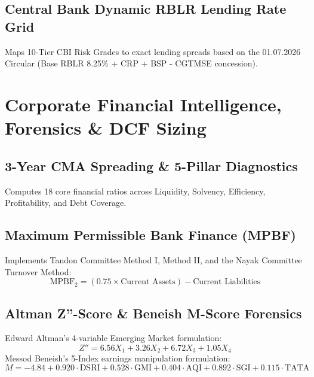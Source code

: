 \documentclass[11pt,a4paper,oneside]{report}
\begin{document}
\section{Central Bank Dynamic RBLR Lending Rate Grid}
Maps 10-Tier CBI Risk Grades to exact lending spreads based on the 01.07.2026 Circular (Base RBLR 8.25\% + CRP + BSP - CGTMSE concession).

\chapter{Corporate Financial Intelligence, Forensics \& DCF Sizing}

\section{3-Year CMA Spreading \& 5-Pillar Diagnostics}
Computes 18 core financial ratios across Liquidity, Solvency, Efficiency, Profitability, and Debt Coverage.

\section{Maximum Permissible Bank Finance (MPBF)}
Implements Tandon Committee Method I, Method II, and the Nayak Committee Turnover Method:
\begin{equation}
\text{MPBF}_2 = (0.75 \times \text{Current Assets}) - \text{Current Liabilities}
\end{equation}

\section{Altman Z''-Score \& Beneish M-Score Forensics}
Edward Altman's 4-variable Emerging Market formulation:
\begin{equation}
Z'' = 6.56 X_1 + 3.26 X_2 + 6.72 X_3 + 1.05 X_4
\end{equation}
Messod Beneish's 5-Index earnings manipulation formulation:
\begin{equation}
M = -4.84 + 0.920 \cdot \text{DSRI} + 0.528 \cdot \text{GMI} + 0.404 \cdot \text{AQI} + 0.892 \cdot \text{SGI} + 0.115 \cdot \text{TATA}
\end{equation}

\end{document}

